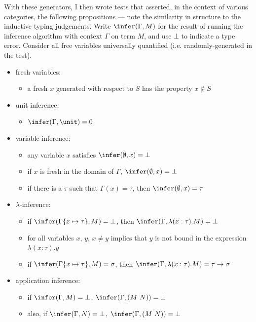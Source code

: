 With these generators, I then wrote tests that asserted, in the context of various categories, the following propositions --- note the similarity in structure to the inductive typing judgements.
Write \(\infer(\Gamma, M)\) for the result of running the inference algorithm with context \(\Gamma\) on term \(M\), and use \(\bot\) to indicate a type error.
Consider all free variables universally quantified (i.e. randomly-generated in the test).
\begin{itemize}
\item fresh variables:
\begin{itemize}
\item a fresh \(x\) generated with respect to \(S\) has the property \(x \notin S\)
\end{itemize}
\item unit inference:
\begin{itemize}
\item \(\infer(\Gamma, \unit) = 0\)
\end{itemize}
\item variable inference:
\begin{itemize}
\item any variable \(x\) satisfies \(\infer(\emptyset, x) = \bot\)
\item if \(x\) is fresh in the domain of \(\Gamma\), \(\infer(\emptyset, x) = \bot\)
\item if there is a \(\tau\) such that \(\Gamma(x) = \tau\), then \(\infer(\emptyset, x) = \tau\)
\end{itemize}
\item \(\lambda\)-inference:
\begin{itemize}
\item if \(\infer(\Gamma\{x \mapsto \tau\}, M) = \bot\), then \(\infer(\Gamma, \lambda (x : \tau). M) = \bot\)
\item for all variables \(x\), \(y\), \(x \neq y\) implies that \(y\) is not bound in the expression \(\lambda (x : \tau). y\)
\item if \(\infer(\Gamma\{x \mapsto \tau\}, M) = \sigma\), then \(\infer(\Gamma,\lambda (x : \tau). M) = \tau \to \sigma\)
\end{itemize}
\item application inference:
\begin{itemize}
\item if \(\infer(\Gamma, M) = \bot\), \(\infer(\Gamma, (M\ N)) = \bot\)
\item also, if \(\infer(\Gamma, N) = \bot\), \(\infer(\Gamma, (M\ N)) = \bot\)

\end{itemize}
\end{itemize}
